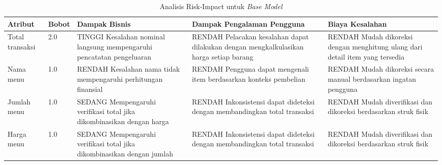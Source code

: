 \begin{table}[h!]
    \centering
    \caption{Analisis Risk-Impact untuk \emph{Base Model}}
    \label{tab:risk-impact-base-model}
    \begin{tabularx}{\textwidth}{|p{1.5cm}|p{1cm}|X|X|X|}
        \hline
        \textbf{Atribut} & \textbf{Bobot} & \textbf{Dampak Bisnis} & \textbf{Dampak Pengalaman Pengguna} & \textbf{Biaya Kesalahan} \\ \hline
        Total transaksi & 2.0 & TINGGI \newline Kesalahan nominal langsung mempengaruhi pencatatan pengeluaran & RENDAH \newline Pelacakan kesalahan dapat dilakukan dengan mengkalkulasikan harga setiap barang & RENDAH \newline Mudah dikoreksi dengan menghitung ulang dari detail item yang tersedia \\ \hline
        Nama menu & 1.0 & RENDAH \newline Kesalahan nama tidak mempengaruhi perhitungan finansial & RENDAH \newline Pengguna dapat mengenali item berdasarkan konteks pembelian & RENDAH \newline Mudah dikoreksi secara manual berdasarkan ingatan pengguna \\ \hline
        Jumlah menu & 1.0 & SEDANG \newline  Mempengaruhi verifikasi total jika dikombinasikan dengan harga & RENDAH \newline Inkonsistensi dapat dideteksi dengan membandingkan total transaksi & RENDAH \newline Mudah diverifikasi dan dikoreksi berdasarkan struk fisik \\ \hline
        Harga menu & 1.0 & SEDANG \newline  Mempengaruhi verifikasi total jika dikombinasikan dengan jumlah & RENDAH \newline Inkonsistensi dapat dideteksi dengan membandingkan total transaksi & RENDAH \newline Mudah diverifikasi dan dikoreksi berdasarkan struk fisik \\ \hline
    \end{tabularx}
\end{table}

